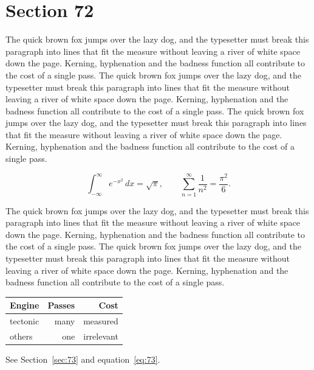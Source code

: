 \documentclass{article}
\begin{document}
\section{Section 72}
\label{sec:72}
The quick brown fox jumps over the lazy dog, and the typesetter must break this paragraph into lines that fit the measure without leaving a river of white space down the page. Kerning, hyphenation and the badness function all contribute to the cost of a single pass. The quick brown fox jumps over the lazy dog, and the typesetter must break this paragraph into lines that fit the measure without leaving a river of white space down the page. Kerning, hyphenation and the badness function all contribute to the cost of a single pass. The quick brown fox jumps over the lazy dog, and the typesetter must break this paragraph into lines that fit the measure without leaving a river of white space down the page. Kerning, hyphenation and the badness function all contribute to the cost of a single pass. 

\begin{equation}\label{eq:72}
\int_{-\infty}^{\infty} e^{-x^{2}}\,dx = \sqrt{\pi}, \qquad
\sum_{n=1}^{\infty} \frac{1}{n^{2}} = \frac{\pi^{2}}{6}.
\end{equation}

The quick brown fox jumps over the lazy dog, and the typesetter must break this paragraph into lines that fit the measure without leaving a river of white space down the page. Kerning, hyphenation and the badness function all contribute to the cost of a single pass. The quick brown fox jumps over the lazy dog, and the typesetter must break this paragraph into lines that fit the measure without leaving a river of white space down the page. Kerning, hyphenation and the badness function all contribute to the cost of a single pass. 

\begin{center}
\begin{tabular}{lrr}
\toprule
Engine & Passes & Cost \\
\midrule
tectonic & many & measured \\
others & one & irrelevant \\
\bottomrule
\end{tabular}
\end{center}

See Section~\ref{sec:73} and equation~\eqref{eq:73}.
\end{document}
